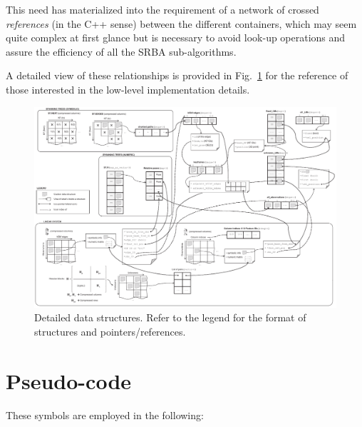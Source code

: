 \documentclass[a4paper,11pt]{article}
\begin{document}
This need has materialized into the requirement of a network of crossed \emph{references} (in the C++ sense)
between the different containers, which may seem quite complex at first glance but 
is necessary to avoid look-up operations and assure the efficiency of all the SRBA sub-algorithms. 

A detailed view of these relationships is provided in Fig.~\ref{fig:detailed.data.structures} 
for the reference of those interested in the low-level implementation details.

\begin{figure}
\centering
\includegraphics[width=1.0\textwidth]{imgs/srba_data_structures.pdf} 
\caption{Detailed data structures. Refer to the legend for the format of structures and pointers/references.}
\label{fig:detailed.data.structures}
\end{figure}



\newpage
\section{Pseudo-code}

These symbols are employed in the following:
\end{document}
